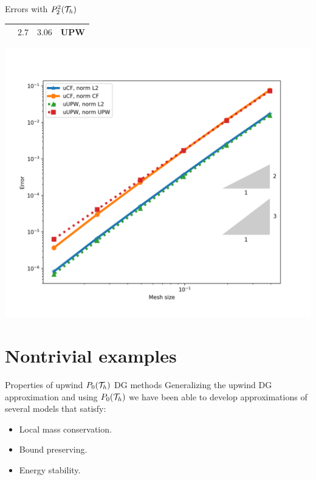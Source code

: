\begin{frame}{Errors with $\relax{P}_2^2(\mathcal{T}_h)$}
\begin{minipage}{0.48\textwidth}
\begin{tabular}{|c|c|c|c|}
					& $2.7$ & $3.06$& UPW\\
					\hline
				\end{tabular}
		\end{minipage}
		\hspace*{0.35cm}
		\begin{minipage}{0.48\textwidth}
			\centering
			\includegraphics[scale=0.30]{img/Conveccion_Reaccion/errores_conveccion_reaccion_P2dc.png}
		\end{minipage}
		\end{frame}

	\section{Nontrivial examples}
		\begin{frame}{Properties of upwind $\relax{P}_0(\mathcal{T}_h)$ DG methods}
		Generalizing the upwind DG approximation and using $\relax{P}_0(\mathcal{T}_h)$ we have been able to develop approximations of several models that satisfy: 
		\vspace*{0.5cm}
			\begin{itemize}\itemsep1em
				\item Local mass conservation.
				\item Bound preserving.
				\item Energy stability.
			\end{itemize}
		\end{frame}

